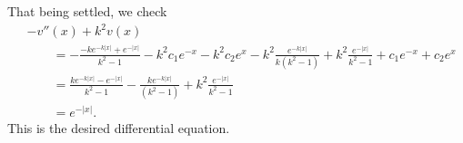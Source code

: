 \documentclass[11pt]{article}
\begin{document}
\begin{solution}
\begin{itemize}
    That being settled, we check 
    \begin{align*}
        &
        - v''(x) + k^{2} v(x)
        \\&\qquad 
        =
        -
        \frac{ - k e^{-k|x|} + e^{-|x|} }{ k^{2}-1 }
        - 
        k^{2} c_1 e^{-x} 
        - 
        k^{2} c_2 e^{x}
        -
        k^{2} \frac{ e^{-k|x|} }{ k (k^2-1) } 
        + 
        k^{2} \frac{ e^{-|x|} }{ k^2-1 } 
        + 
        c_1 e^{-x} 
        + 
        c_2 e^{x}
        \\&\qquad 
        =
        \frac{ k e^{-k|x|} - e^{-|x|} }{ k^{2}-1 }
        - 
        \frac{ k e^{-k|x|} }{ (k^2-1) } 
        + 
        k^{2} \frac{ e^{-|x|} }{ k^2-1 } 
        \\&\qquad 
        =
        e^{-|x|}
        .
    \end{align*}
    This is the desired differential equation. 
    \end{itemize}
\begin{comment}
    We first note that the Fourier transform of $e^{-|x|}$ is given by
    \begin{align*}
        \mathcal F(e^{-|x|})(\omega) = \sqrt{\frac{2}{\pi}} \frac{1}{1+\omega^2}.
    \end{align*}
    Therefore, if $u(x)$ is a solution, then its Fourier transform $\hat u(\omega)$ satisfies
    \begin{align*}
        (\omega^2 + k^2) \hat u(\omega) = \sqrt{\frac{2}{\pi}} \frac{1}{1+\omega^2}.
    \end{align*}
    Therefore, if $k = 1$, then
    \begin{align*}
        \hat u(\omega) &= \sqrt{\frac{2}{\pi}} \frac{1}{(1+\omega^2)^2}\\
                    &= \mathcal{F}^{-1}(\frac{1}{2}(1 + |x|) e^{-|x|}).
    \end{align*}
    The last step can be seen from the results in the lecture.
    Thus, it is clear that $u(x) = \frac 1 2 (1+|x|) e^{-|x|}$ is a solution. Furthermore, 

    For the case $k \neq 1$, note that
    \begin{align*}
        \mathcal{F}(e^{-k|x|})(\omega) = \sqrt{\frac{2}{\pi}} \frac{k}{k^2 + \omega^2}.
    \end{align*}
    Therefore, the Fourier transform of the solution $u(x)$ satisfies
    \begin{align*}
        (\omega^2 + k^2) \hat u(\omega) &= \sqrt{\frac{2}{\pi}} (k^2 + \omega^2) \left[ \frac{-1}{(k^2 + \omega^2)(k^2 - 1)} + \frac{1}{(\omega^2 + 1)(k^2 - 1)} \right]
        \\
        &= \sqrt{\frac{2}{\pi}} (k^2 + \omega^2) \left[ \frac{k^2 -1}{(\omega^2 + 1)(k^2 - 1)(k^2 + \omega^2)} \right]
        \\
        &= \sqrt{\frac{2}{\pi}} \frac{1}{(1 + \omega^2)},
    \end{align*}
    as desired. The argument for the general solution is the same as for the case $k=1$.
\end{comment}
\end{solution}
\end{document}

